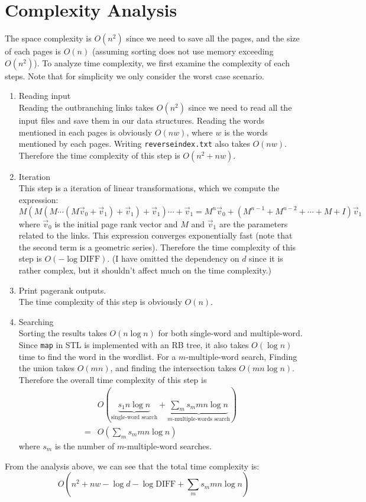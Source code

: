 \documentclass[12pt]{article}
\begin{document}
\section{Complexity Analysis}%
The space complexity is $O\left(n^2\right)$ since we need to save all the pages,
and the size of each pages is $O(n)$ (assuming sorting does not use memory exceeding
$O\left(n^2\right)$). To analyze time complexity, we first examine
the complexity of each steps. Note that for simplicity we only consider the worst
case scenario.

\begin{enumerate}
	\item Reading input\\
	Reading the outbranching links takes $O\left(n^2\right)$ since we need to
	read all the input files and save them in our data structures. Reading
	the words mentioned in each pages is obviously $O(nw)$, where $w$ is the words
	mentioned by each pages. Writing \texttt{reverseindex.txt} also takes
	$O(nw)$. Therefore the time complexity of this step is $O\left(n^2+nw\right)$.
		
	\item Iteration\\
	This step is a iteration of linear transformations, which we compute the 
	expression:
	\begin{equation*}
		M(M(M \cdots (M\vec{v}_0 + \vec{v}_1) + \vec{v}_1 ) + \vec{v}_1) \cdots + \vec{v} _1 
		= M^n \vec{v}_0 + \left(M^{n-1} + M^{n-2} + \cdots+ M + I\right) \vec{v}_1 
	\end{equation*}
	where $\vec{v}_0$ is the initial page rank vector and $M$ and $\vec{v}_1$ 
	are the parameters related to the links.
	This expression converges exponentially fast (note that the second term is 
	a geometric series). Therefore the time complexity of this step is
	$O\left(- \log \text{DIFF}\right)$. (I have omitted the dependency on $d$
	since it is rather complex, but it shouldn't affect much on the time complexity.)

	\item Print pagerank outputs.\\
	The time complexity of this step is obviously $O(n)$.

	\item Searching\\
	Sorting the results takes $O(n\log n)$ for both single-word and multiple-word.
	Since \texttt{map} in STL is implemented with an RB tree, it also takes
	$O(\log n)$ time to find the word in the wordlist. For a $m$-multiple-word
	search, Finding the union takes $O(mn)$, and finding the intersection takes
	$O(mn\log n)$. Therefore the overall time complexity of this step is
	\begin{align*}
		&O\left(\underbrace{s_1 n \log n}_\text{single-word search} + 
		\underbrace{\sum_m s_m mn\log n}_{m\text{-multiple-words search}}\right)\\
		=& O \left(\sum_m s_m mn\log n\right)
	\end{align*}
	where $s_m$ is the number of $m$-multiple-word searches.
\end{enumerate}
From the analysis above, we can see that the total time complexity is:
\begin{equation*}
	O\left(n^2 + nw -\log d - \log \text{DIFF} + \sum_m s_m mn\log n\right)
\end{equation*}
\end{document}
